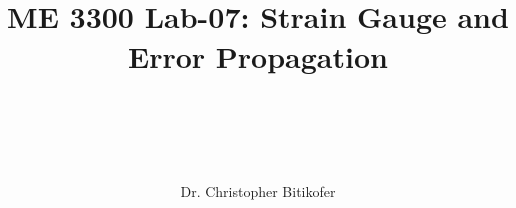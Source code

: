 
\title{
\begin{center}
\HRule \\[0.4cm]
{\Huge \bfseries ME 3300 Lab-07: 
Strain Gauge and Error Propagation \\[0.5cm] 
}\\[0.4cm] %
\HRule \\[1.5cm]
\end{center}
}
\author{\Large Dr. Christopher Bitikofer \\ \\ \\[.1cm]} %
\date{} %

\maketitle
\tableofcontents